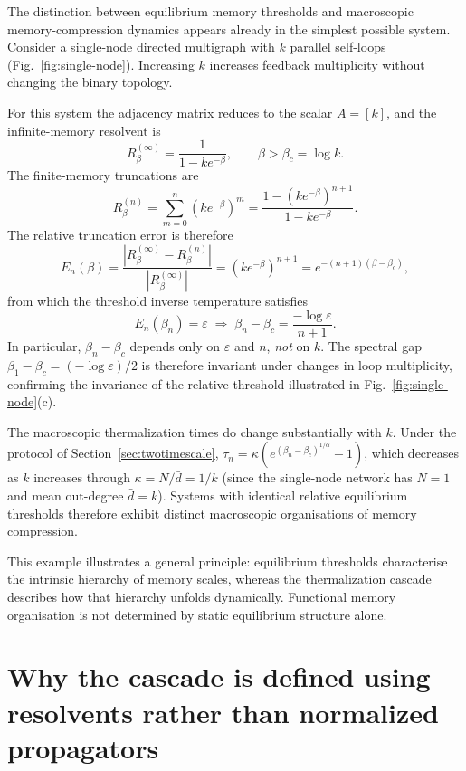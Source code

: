 \documentclass[aps,superscriptaddress,11pt]{revtex4-2}
\theoremstyle{definition}
\theoremstyle{plain}
\begin{document}
The distinction between equilibrium memory thresholds and macroscopic
memory-compression dynamics appears already in the simplest possible
system. Consider a single-node directed multigraph with $k$ parallel
self-loops (Fig.~\ref{fig:single-node}). Increasing $k$
increases feedback multiplicity without changing the binary topology.

For this system the adjacency matrix reduces to the scalar $A = [k]$, and
the infinite-memory resolvent is
\[
  R_\beta^{(\infty)}
  = \frac{1}{1-ke^{-\beta}},
  \qquad \beta > \beta_c = \log k.
\]
The finite-memory truncations are
\[
  R_\beta^{(n)}
  = \sum_{m=0}^{n}(ke^{-\beta})^m
  = \frac{1-(ke^{-\beta})^{n+1}}{1-ke^{-\beta}}.
\]
The relative truncation error is therefore
\[
  E_n(\beta)
  = \frac{|R_\beta^{(\infty)}-R_\beta^{(n)}|}{|R_\beta^{(\infty)}|}
  = (ke^{-\beta})^{n+1}
  = e^{-(n+1)(\beta-\beta_c)},
\]
from which the threshold inverse temperature satisfies
\[
  E_n(\beta_n) = \varepsilon
  \;\Longrightarrow\;
  \beta_n - \beta_c = \frac{-\log\varepsilon}{n+1}.
\]
In particular, $\beta_n - \beta_c$ depends only on $\varepsilon$ and $n$,
\emph{not} on $k$. The spectral gap $\beta_1-\beta_c = (-\log\varepsilon)/2$
is therefore invariant under changes in loop multiplicity, confirming the
invariance of the relative threshold illustrated in Fig.~\ref{fig:single-node}(c).

The macroscopic thermalization times do change substantially with $k$. Under
the protocol of Section~\ref{sec:twotimescale}, $\tau_n = \kappa(
e^{(\beta_n-\beta_c)^{1/\alpha}} - 1)$, which decreases as $k$ increases
through $\kappa = N/\bar{d} = 1/k$ (since the single-node network has
$N=1$ and mean out-degree $\bar{d}=k$). Systems with identical relative
equilibrium thresholds therefore exhibit distinct macroscopic organisations
of memory compression.

This example illustrates a general principle: equilibrium thresholds
characterise the intrinsic hierarchy of memory scales, whereas the
thermalization cascade describes how that hierarchy unfolds dynamically.
Functional memory organisation is not determined by static equilibrium
structure alone.

\section{Why the cascade is defined using resolvents rather than normalized propagators}
\label{sec:resolvent_vs_propagator}
\end{document}
